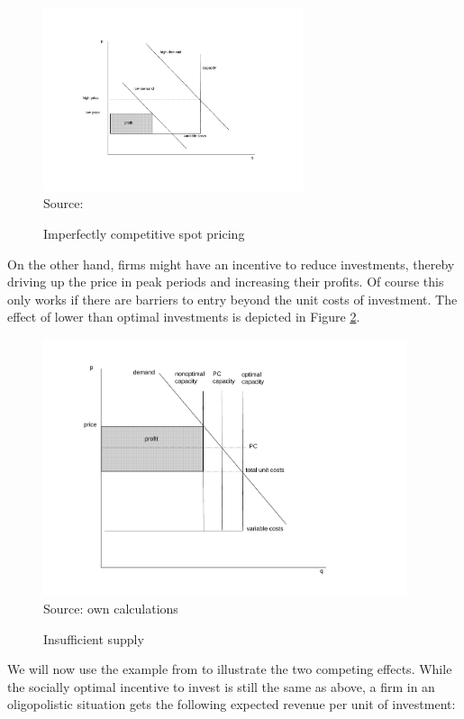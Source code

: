 \begin{figure}[h]
\centering
\caption{Imperfectly competitive spot pricing}
\includegraphics[width=3.0in]{capacity/imperfect_spot_pricing.pdf}
      \label{peak_load_toohigh}  
\\          
\scriptsize Source: \cite{Fehr1995}
\end{figure}

On the other hand, firms might have an incentive to reduce investments, thereby driving up the price in peak periods and increasing their profits. Of course this only works if there are barriers to entry beyond the unit costs of investment. The effect of lower than optimal investments is depicted in Figure \ref{peak_load_insufficient}.

\begin{figure}[h]
\centering
\caption{Insufficient supply}
\includegraphics[width=4.2in]{capacity/insufficient_supply.pdf}
      \label{peak_load_insufficient}  
\\          
\scriptsize Source: own calculations
\end{figure}

We will now use the example from \cite{Fehr1995} to illustrate the two competing effects.
While the socially optimal incentive to invest is still the same as above, a firm in an oligopolistic situation gets the following expected revenue per unit of investment:

